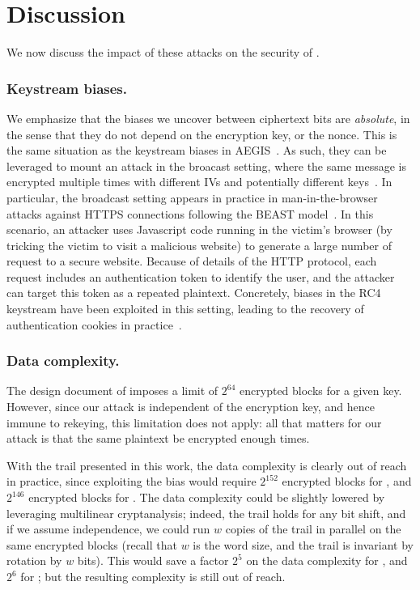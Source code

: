 
\section{Discussion}
\label{sec/Discussion}


We now discuss the impact of these attacks on the security of \MORUS.

\subsubsection{Keystream biases.}

We emphasize that the biases we uncover between ciphertext bits are
\emph{absolute}, in the sense that they do not depend on the encryption
key, or the nonce.  This is the same situation as the keystream biases
in AEGIS~\cite{sacryptMinaud14}.  As such, they can be leveraged to
mount an attack in the broacast setting, where the same message is
encrypted multiple times with different IVs and potentially different
keys~\cite{DBLP:conf/fse/MantinS01}.  In particular, the broadcast setting appears
in practice in man-in-the-browser attacks against HTTPS connections
following the BEAST model~\cite{duong2011here}.  In this scenario, an
attacker uses Javascript code running in the victim's browser (by
tricking the victim to visit a malicious website) to generate a large
number of request to a secure website.  Because of details of the HTTP
protocol, each request includes an authentication token to identify the
user, and the attacker can target this token as a repeated plaintext.
Concretely, biases in the RC4 keystream have been exploited in this
setting, leading to the recovery of authentication cookies in
practice~\cite{DBLP:conf/uss/AlFardanBPPS13}.

\subsubsection{Data complexity.}

The design document of  imposes a limit of $2^{64}$
encrypted blocks for a given key. However, since our attack is
independent of the encryption key, and hence immune to rekeying, this
limitation does not apply: all that matters for our attack is that the
same plaintext be encrypted enough times.

With the trail presented in this work, the data complexity is clearly
out of reach in practice, since exploiting the bias would require
$2^{152}$ encrypted blocks for , and $2^{146}$
encrypted blocks for . The data complexity could be
slightly lowered by leveraging multilinear cryptanalysis; indeed, the
trail holds for any bit shift, and if we assume independence, we could
run $w$ copies of the trail in parallel on the same encrypted blocks
(recall that $w$ is the word size, and the trail is invariant by
rotation by $w$ bits). This would save a factor $2^5$ on the data
complexity for , and $2^6$ for ; but
the resulting complexity is still out of reach.

